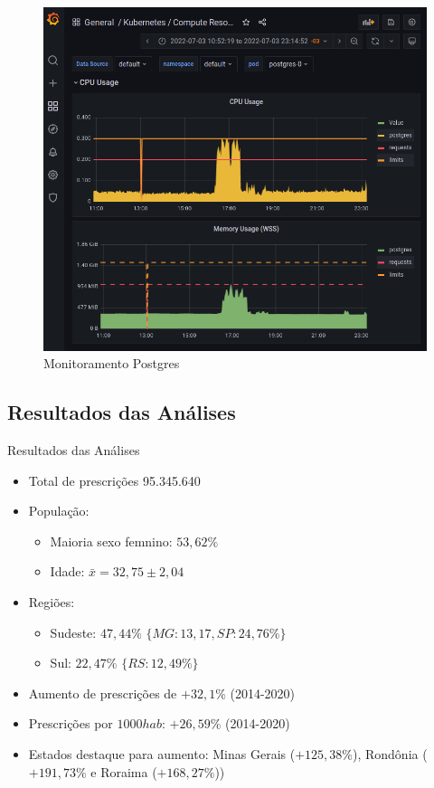 \documentclass[10pt,brazil]{beamer}
\theoremstyle{definition}
\begin{document}
\begin{frame}[plain]
  \hspace*{-10mm}
    \begin{figure}
    \centering  
  \includegraphics[width=.6\paperwidth]{postgres_resource.png}
      \caption[Monitoramento Postgres]{Monitoramento Postgres}
  \end{figure}  
\end{frame}

\subsection{Resultados das Análises}
\begin{frame}{Resultados das Análises}

    \begin{itemize}
      \item Total de prescrições 95.345.640 
      \item População:
      \begin{itemize}
        \item Maioria sexo femnino: $53,62\%$
        \item Idade: $\bar{x} = 32,75 \pm 2,04$
      \end{itemize}
      \item Regiões:
        \begin{itemize}
          \item Sudeste: $47,44\%$ $\{MG: 13,17,SP: 24,76\%\}$
          \item Sul: $22,47\%$ $\{RS: 12,49\%\}$
        \end{itemize}
      \item Aumento de prescrições de $+32,1\%$ (2014-2020)
      \item Prescrições por $1000 hab$: $+26,59\%$ (2014-2020)
      \item Estados destaque para aumento:  Minas Gerais ($+125,38\%$), Rondônia ($+191,73\%$ e Roraima ($+168,27\%$))
    \end{itemize}
\end{frame}
\end{document}
